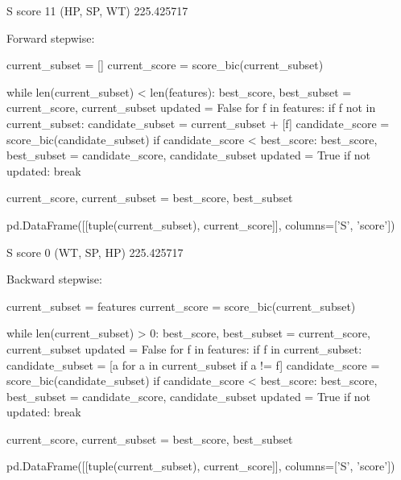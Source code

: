 \begin{python}

\end{python}

\begin{console}
               S       score
11  (HP, SP, WT)  225.425717
\end{console}

Forward stepwise:

\begin{python}
current_subset = []
current_score = score_bic(current_subset)

while len(current_subset) < len(features):
    best_score, best_subset = current_score, current_subset
    updated = False
    for f in features:
        if f not in current_subset:
            candidate_subset = current_subset + [f]
            candidate_score = score_bic(candidate_subset)
            if candidate_score < best_score:
                best_score, best_subset = candidate_score, candidate_subset
                updated = True              
    if not updated:
        break
        
    current_score, current_subset = best_score, best_subset
    
pd.DataFrame([[tuple(current_subset), current_score]], columns=['S', 'score'])
\end{python}

\begin{console}
              S       score
0  (WT, SP, HP)  225.425717
\end{console}

Backward stepwise:

\begin{python}
current_subset = features
current_score = score_bic(current_subset)

while len(current_subset) > 0:
    best_score, best_subset = current_score, current_subset
    updated = False
    for f in features:
        if f in current_subset:
            candidate_subset = [a for a in current_subset if a != f]
            candidate_score = score_bic(candidate_subset)
            if candidate_score < best_score:
                best_score, best_subset = candidate_score, candidate_subset
                updated = True              
    if not updated:
        break
        
    current_score, current_subset = best_score, best_subset
    
pd.DataFrame([[tuple(current_subset), current_score]], columns=['S', 'score'])
\end{python}

